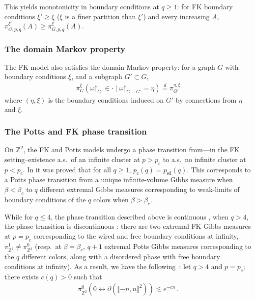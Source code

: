 \documentclass[reqno,11pt]{amsart}
\numberwithin{equation}{section}
\renewcommand{\restriction}{\mathord{\upharpoonright}}
\theoremstyle{definition}{
\newtheorem{example}[theorem]{Example}
\newtheorem{definition}[theorem]{Definition}
\newtheorem*{definition*}{Definition}
\newtheorem{problem}[theorem]{Problem}
\newtheorem{question}[theorem]{Question}
\newtheorem{remark}[theorem]{Remark}
}
\newcommand{\llb }{\llbracket}
\newcommand{\rrb }{\rrbracket}
\newcommand{\sd}{{\operatorname{sd}}}
\begin{document}
This yields monotonicity in boundary conditions at $q\geq 1$: for FK boundary conditions $\xi'\geq \xi$  ($\xi$ is a finer partition than $\xi'$) and every increasing $A$, $\pi^{\xi'}_{G,p,q}(A) \geq \pi_{G,p,q}^\xi(A)$.

\subsubsection*{The domain Markov property} The FK model also satisfies the domain Markov property: for a graph $G$ with boundary conditions $\xi$, and a subgraph $G'\subset G$,  
\begin{align*}
\pi_G^\xi(\omega \restriction_{G'}\in \cdot \mid \omega\restriction_{G-G'} = \eta) \stackrel{d}= \pi_{G'}^{\eta,\xi}
\end{align*}
where $(\eta,\xi)$ is the boundary conditions induced on $G'$ by connections from $\eta$ and $\xi$. 

\subsubsection*{The Potts and FK phase transition} On $\mathbb Z^2$, the FK and Potts models undergo a phase transition from---in the FK setting--existence a.s.\  of an infinite cluster at $p>p_c$ to a.s.\ no infinite cluster at $p<p_c$. In \cite{BeDu12} it was proved that  for all $q\geq 1$, $p_c(q)=p_{\sd} (q)$. This corresponds to a Potts phase transition from a unique infinite-volume Gibbs measure when $\beta<\beta_c$ to $q$ different extremal Gibbs measures corresponding to weak-limits of boundary conditions of the $q$ colors when $\beta>\beta_c$.

While for $q\leq 4$, the phase transition described above is continuous \cite{DST15}, when $q>4$, the phase transition is discontinuous \cite{DGHMT16}: there are two extremal FK Gibbs measures at $p=p_c$ corresponding to the wired and free boundary conditions at infinity, $\pi^1_{\mathbb Z^2}\neq \pi^0_{\mathbb Z^2}$ (resp.\ at $\beta=\beta_c$, $q+1$ extremal Potts Gibbs measures corresponding to the $q$ different colors, along with a disordered phase with free boundary conditions at infinity). As a result, we have the following~\cite{DST15,DGHMT16}: let $q>4$ and $p=p_c$; there exists $c(q)>0$ such that
\begin{align}\label{eq:exp-decay}
\pi^0_{\mathbb Z^2} \left(0\longleftrightarrow \partial (\llb -n,n\rrb ^2)\right) \lesssim e^{-cn}\,.
\end{align}
\end{document}
